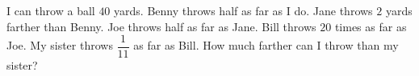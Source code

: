 I can throw a ball \(40\) yards. Benny throws half as far as I do. Jane throws \(2\) yards farther than Benny. Joe throws half as far as Jane. Bill throws \(20\) times as far as Joe. My sister throws \(\dfrac{1}{11}\) as far as Bill. How much farther can I throw than my sister?
